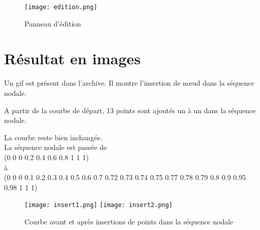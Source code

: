 \documentclass[10pt]{article}
\begin{document}
\begin{figure}[!h]
\centering
\texttt{[image: edition.png]}
\caption{Panneau d'édition}
\end{figure}


\section{Résultat en images}

Un gif est présent dans l'archive. Il montre l'insertion de n\oe ud dans la séquence nodale.

A partir de la courbe de départ, 13 points sont ajoutés un à un dans la séquence nodale.

La courbe reste bien inchangée.\\

La séquence nodale est passée de\\

(0 0 0 0.2 0.4 0.6 0.8 1 1 1)\\

à \\

(0 0 0 0.1 0.2 0.3 0.4 0.5 0.6 0.7 0.72 0.73 0.74 0.75 0.77 0.78 0.79 0.8 0.9 0.95 0.98 1 1 1)

\begin{figure}[!h]
\centering
\texttt{[image: insert1.png]}\vspace{.4cm}
\texttt{[image: insert2.png]}
\caption{Courbe avant et après insertions de points dans la séquence nodale}
\end{figure}
\end{document}
